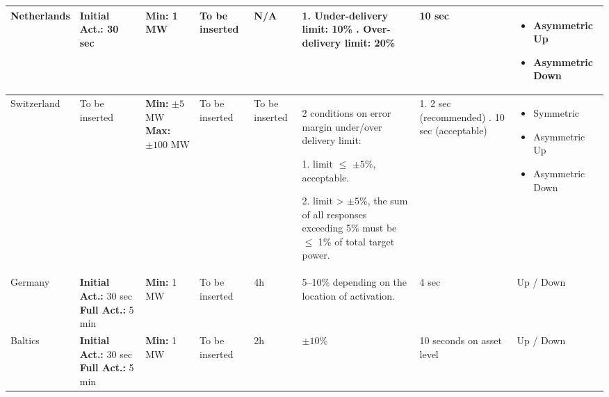 \begin{landscape}
\begin{longtable}{|p{2.5cm}|p{2.5cm}|p{2.5cm}|p{2.5cm}|p{2.5cm}|p{4cm}|p{2.5cm}|p{2.5cm}|}
\hline
Netherlands 
& 
\textbf{Initial Act.: }30 sec
& 
\textbf{Min: }1 MW
& 
To be inserted
& 
N/A
& 
1. Under-delivery limit: 10\%
\newline 2. Over-delivery limit: 20\%
& 10 sec 
& \begin{itemize}[leftmargin=*, nosep]
  \item Asymmetric Up
  \item Asymmetric Down
\end{itemize}\\

\hline
Switzerland 
& 
To be inserted
& 
\textbf{Min: }$\pm 5$ MW
\newline \textbf{Max: }$\pm 100$ MW
& 
To be inserted 
& 
To be inserted & 
2 conditions on error margin under/over delivery limit:

1. limit $\leq$ $\pm 5$\%, acceptable.

2. limit > $\pm 5$\%, the sum of all responses exceeding 5\% must be $\leq$ 1\% of total target power.
& 
1. 2 sec (recommended)
\newline 
2. 10 sec (acceptable) &
\begin{itemize}[leftmargin=*, nosep]
    \item Symmetric
    \item Asymmetric Up
    \item Asymmetric Down
\end{itemize} 
\\

\hline
Germany 
& 
\textbf{Initial Act.:} 30 sec \newline
\textbf{Full Act.:} 5 min 
& 
\textbf{Min: }1 MW
& To be inserted 
& 4h & 
5--10\% depending on the location of activation.
& 
4 sec 
& 
Up / Down \\


\hline
Baltics 
&
\textbf{Initial Act.:} 30 sec \newline
\textbf{Full Act.:} 5 min 
&
\textbf{Min: }1 MW
& To be inserted 
& 
2h & 
$\pm 10$\%
& 
10 seconds on asset level
& Up / Down  \\
\hline
\end{longtable}
\normalsize
\end{landscape}



    



